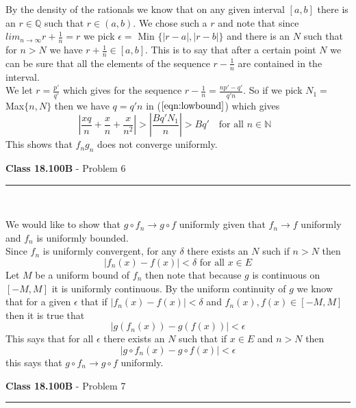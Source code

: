 \documentclass[11pt,reqno]{article}
\begin{document}
By the density of the rationals we know that on any given interval $[a,b]$ there is an $r \in \mathbb{Q}$ such that $r \in (a,b)$. We chose such a $r$ and note that since $lim_{n \to \infty} r + \frac{1}{n} = r$ we pick $\epsilon = $ Min $\{ |r-a|, |r-b| \}$ and there is an $N$ such that for $n > N$ we have $r + \frac{1}{n} \in [a,b]$. This is to say that after a certain point $N$ we can be sure that all the elements of the sequence $r-\frac{1}{n}$ are contained in the interval.\\
\indent We let $r = \frac{p'}{q'}$ which gives for the sequence $r - \frac{1}{n} = \frac{np' - q'}{q'n}$. So if we pick $N_1 = $ Max$\{n,N\}$ then we have $q =  q'n$ in ($\ref{eqn:lowbound}$) which gives
\[ | \frac{xq}{n} + \frac{x}{n} + \frac{x}{n^2} | > |\frac{Bq'N_1}{n}| > Bq' \quad \text{for all $n \in \mathbb{N}$ }\]
This shows that $f_n g_n$ does not converge uniformly.

\vspace{15pt}
\begin{flushleft} 
\textbf{Class 18.100B} - Problem 6\\
\rule{500pt}{1pt}\\
\end{flushleft} 

We would like to show that $g \circ f_n \to g \circ f$ uniformly given that $f_n \to f$ uniformly and $f_n$ is uniformly bounded.\\
Since $f_n$ is uniformly convergent, for any $\delta$ there exists an $N$ such if $n > N$ then 
\[  |f_n(x) - f(x)| < \delta \text{ for all $x \in E$} \]
Let $M$ be a uniform bound of $f_n$ then note that because $g$ is continuous on $[-M,M]$ it is uniformly continuous. By the uniform continuity of $g$ we know that for a given $\epsilon$ that if $|f_n(x) - f(x)| < \delta $ and $f_n(x),f(x) \in [-M,M]$ then it is true that 
\[ |g(f_n(x)) - g(f(x))| < \epsilon \]
This says that for all $\epsilon$ there exists an $N$ such that if $x \in E$ and $n > N$ then 
\[ |g \circ f_n(x) - g \circ f(x)| < \epsilon \]
this says that $g \circ f_n \to g \circ f$ uniformly.

\vspace{15pt}
\begin{flushleft} 
\textbf{Class 18.100B} - Problem 7\\
\rule{500pt}{1pt}\\
\end{flushleft} 

\end{document}
